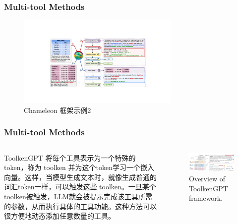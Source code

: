\begin{frame}
	\frametitle{Multi-tool Methods}
	\begin{figure}[h]
		\centering
		\includegraphics[width=0.7\textwidth]{pic/showcase_tabmwp_two.pdf}
		\caption{Chameleon 框架示例2}
		\label{fig:showcase_tabmwp}
	\end{figure}
\end{frame}


\begin{frame}
	\frametitle{Multi-tool Methods}
	\begin{columns}
		\begin{column}{.3\textwidth}
			{\small ToolkenGPT 将每个工具表示为一个特殊的token，称为 toolken 并为这个token学习一个嵌入向量。这样，当模型生成文本时，就像生成普通的词汇token一样，可以触发这些 toolken。一旦某个toolken被触发，LLM就会被提示完成该工具所需的参数，从而执行具体的工具功能。这种方法可以很方便地动态添加任意数量的工具。}
		\end{column}
		\begin{column}{.7\textwidth}
			\begin{figure}[t!]
				\centering
				\includegraphics[width=\linewidth]{pic/ToolkenGPT-final-figure1.pdf}
				\caption{Overview of ToolkenGPT framework.}
				\label{fig:framework}
				\vspace{-5pt}
			\end{figure}
		\end{column}

	\end{columns}

\end{frame}

